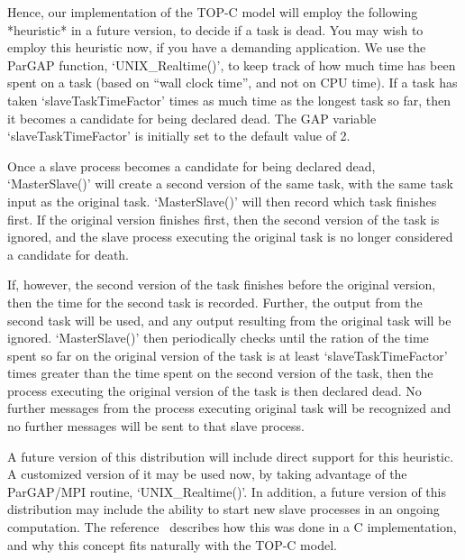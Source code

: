Hence, our implementation of the TOP-C model will employ the following
*heuristic* in a future version, to decide if a task is dead.  You may
wish to employ this heuristic now, if you have a demanding application.
We use the ParGAP function, `UNIX_Realtime()', to keep track of how
much time has been spent on a task (based on ``wall clock time'', and not
on CPU time).  If a task has taken `slaveTaskTimeFactor' times as
much time as the longest task so far, then it becomes a candidate
for being declared dead.  The GAP variable `slaveTaskTimeFactor' is
initially set to the default value of 2.

Once a slave process becomes a candidate for being declared dead,
`MasterSlave()' will create a second version of the same task, with the
same task input as the original task.  `MasterSlave()' will then record
which task finishes first.  If the original version finishes first, then
the second version of the task is ignored, and the slave process executing
the original task is no longer considered a candidate for death.

If, however, the second version of the task finishes before the
original version, then the time for the second task is recorded.
Further, the output from the second task will be used, and any output
resulting from the original task will be ignored.  `MasterSlave()' then
periodically checks until the ration of the time spent so far on the
original version of the task is at least `slaveTaskTimeFactor' times
greater than the time spent on the second version of the task, then the
process executing the original version of the task is then declared
dead.  No further messages from the process executing original task
will be recognized and no further messages will be sent to that slave
process.

A future version of this distribution will include direct support for
this heuristic.  A customized version of it may be used now, by taking
advantage of the ParGAP/MPI routine, `UNIX_Realtime()'.  In addition,
a future version of this distribution may include the ability to
start new slave processes in an ongoing computation.  The
reference~\cite{CG98} describes how this was done in a C implementation,
and why this concept fits naturally with the TOP-C model.

